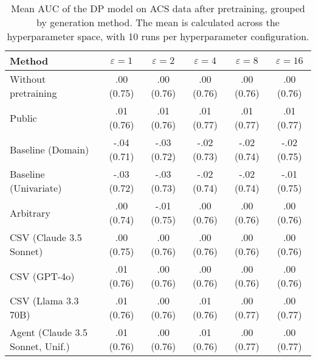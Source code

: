 \begin{table}[h!]
    \centering
    \caption{Mean AUC of the DP model on ACS data after pretraining, grouped by generation method. The mean is calculated across the hyperparameter space, with 10 runs per hyperparameter configuration.}
    \label{tab:epsilon_comparison}
    \begin{tabular}{lccccc}
    \toprule
    Method & $\varepsilon=1$ & $\varepsilon=2$ & $\varepsilon=4$ & $\varepsilon=8$ & $\varepsilon=16$ \\
    \midrule
    Without pretraining & .00 {\small (0.75)} & .00 {\small (0.76)} & .00 {\small (0.76)} & .00 {\small (0.76)} & .00 {\small (0.76)} \\
    \arrayrulecolor{black!50!}\midrule
    Public & \cellcolor{gold!30}.01 {\small (0.76)} & \cellcolor{gold!30}.01 {\small (0.76)} & \cellcolor{gold!30}.01 {\small (0.77)} & \cellcolor{gold!30}.01 {\small (0.77)} & \cellcolor{gold!30}.01 {\small (0.77)} \\
    \arrayrulecolor{black!50!}\midrule
    Baseline (Domain) & -.04 {\small (0.71)} & -.03 {\small (0.72)} & -.02 {\small (0.73)} & -.02 {\small (0.74)} & -.02 {\small (0.75)} \\
    Baseline (Univariate) & -.03 {\small (0.72)} & -.03 {\small (0.73)} & -.02 {\small (0.74)} & -.02 {\small (0.74)} & -.01 {\small (0.75)} \\
    \arrayrulecolor{black!50!}\midrule
    Arbitrary & .00 {\small (0.74)} & -.01 {\small (0.75)} & .00 {\small (0.76)} & .00 {\small (0.76)} & .00 {\small (0.76)} \\
    \arrayrulecolor{black!50!}\midrule
    CSV (Claude 3.5 Sonnet) & .00 {\small (0.75)} & .00 {\small (0.76)} & .00 {\small (0.76)} & .00 {\small (0.76)} & .00 {\small (0.76)} \\
    CSV (GPT-4o) & .01 {\small (0.76)} & .00 {\small (0.76)} & .00 {\small (0.76)} & .00 {\small (0.76)} & .00 {\small (0.76)} \\
    CSV (Llama 3.3 70B) & \cellcolor{bronze!30}.01 {\small (0.76)} & \cellcolor{silver!30}.00 {\small (0.76)} & \cellcolor{silver!30}.01 {\small (0.76)} & \cellcolor{silver!30}.00 {\small (0.77)} & \cellcolor{silver!30}.00 {\small (0.77)} \\
    \arrayrulecolor{black!50!}\midrule
    Agent (Claude 3.5 Sonnet, Unif.) & \cellcolor{silver!30}.01 {\small (0.76)} & \cellcolor{bronze!30}.00 {\small (0.76)} & \cellcolor{silver!30}.01 {\small (0.76)} & \cellcolor{bronze!30}.00 {\small (0.77)} & \cellcolor{bronze!30}.00 {\small (0.77)} \\

\end{tabular}
\end{table}
